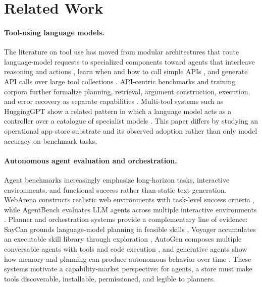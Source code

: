 \documentclass[10pt,twocolumn]{article}
\begin{document}
\section{Related Work}
\label{sec:related}

\paragraph{Tool-using language models.}
The literature on tool use has moved from modular architectures that route language-model requests to specialized components \cite{karpas2022mrkl} toward agents that interleave reasoning and actions \cite{yao2023react}, learn when and how to call simple APIs \cite{schick2023toolformer}, and generate API calls over large tool collections \cite{patil2024gorilla}. API-centric benchmarks and training corpora further formalize planning, retrieval, argument construction, execution, and error recovery as separate capabilities \cite{li2023apibank,qin2023toollm,song2023restgpt}. Multi-tool systems such as HuggingGPT show a related pattern in which a language model acts as a controller over a catalogue of specialist models \cite{shen2023hugginggpt}. This paper differs by studying an operational app-store substrate and its observed adoption rather than only model accuracy on benchmark tasks.

\paragraph{Autonomous agent evaluation and orchestration.}
Agent benchmarks increasingly emphasize long-horizon tasks, interactive environments, and functional success rather than static text generation. WebArena constructs realistic web environments with task-level success criteria \cite{zhou2023webarena}, while AgentBench evaluates LLM agents across multiple interactive environments \cite{liu2023agentbench}. Planner and orchestration systems provide a complementary line of evidence: SayCan grounds language-model planning in feasible skills \cite{ahn2022saycan}, Voyager accumulates an executable skill library through exploration \cite{wang2023voyager}, AutoGen composes multiple conversable agents with tools and code execution \cite{wu2023autogen}, and generative agents show how memory and planning can produce autonomous behavior over time \cite{park2023generativeagents}. These systems motivate a capability-market perspective: for agents, a store must make tools discoverable, installable, permissioned, and legible to planners.
\end{document}
